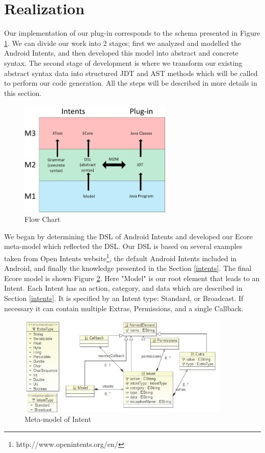 \section{Realization}
\label{realisation}

Our implementation of our plug-in corresponds to the schema presented in Figure \ref{flowchart}. We can divide our work into 2 stages; first we analyzed and modelled the Android Intents, and then developed this model into abstract and concrete syntax. The second stage of development is where we transform our existing abstract syntax data into structured JDT and AST methods which will be called to perform our code generation. All the steps will be described in more details in this section.  

\begin{figure}[t]
  \centering
    \includegraphics[width=0.65\textwidth]{flowchart}
  \caption{Flow Chart}
\label{flowchart}
\end{figure}

We began by determining the DSL of Android Intents and developed our Ecore meta-model which reflected the DSL. Our DSL is based on several examples taken from Open Intents website\footnote{http://www.openintents.org/en/}, the default Android Intents included in Android, and finally the knowledge presented in the Section \ref{intents}. The final Ecore model is shown Figure \ref{meta-model}. Here "Model" is our root element that leads to an Intent. Each Intent has an action, category, and data which are described in Section \ref{intents}. It is specified by an Intent type: Standard, or Broadcast. If necessary it can contain multiple Extras, Permissions, and a single Callback.

\begin{figure}[t]
  \centering
    \includegraphics[width=0.9\textwidth]{metamodel}
  \caption{Meta-model of Intent}
\label{meta-model}
\end{figure}

